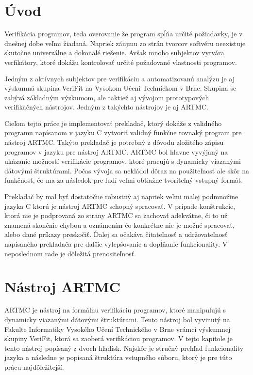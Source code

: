 
\chapter{Úvod}
Verifikácia programov, teda overovanie že program spĺňa určité požiadavky, je v dnešnej dobe veľmi žiadaná. Napriek záujmu zo strán tvorcov softvéru neexistuje skutočne univerzálne a dokonalé riešenie. Avšak mnoho subjektov vytvára verfikátory, ktoré dokážu kontrolovať určité požadované vlastnosti programov.

Jedným z aktívnych subjektov pre verifikáciu a automatizovanú analýzu je aj výskumná skupina VeriFit na Vysokom Učení Technickom v Brne. Skupina se zabývá základným výzkumom, ale taktiež aj vývojom prototypových verifikačných nástrojov. Jedným z takýchto nástrojov je aj ARTMC.

Cieľom tejto práce je implementovať prekladač, ktorý dokáže z validného programu napísanom v jazyku C vytvoriť validný funkčne rovnaký program pre nástroj ARTMC. Takýto prekladač je potrebný z dôvodu zložitého zápisu programov v jazyku pre nástroj ARTMC. ARTMC bol hlavne vyvýjaný na ukázanie možností verifikácie programov, ktoré pracujú s dynamicky viazanými dátovými štruktúrami. Počas vývoja sa nekládol dôraz na použiteľnosť ale skôr na funkčnosť, čo ma za následok pre ľudí veľmi obtiažne tvoriteľný vstupný formát.

Prekladač by mal byť dostatočne robustný aj napriek veľmi malej podmnožine jazyka C ktorú je nástroj ARTMC schopný spracovať. V prípade konštrukcie, ktorá nie je podprovaná zo strany ARTMC sa zachovať adekvátne, či to už znamená skončnie chybou a oznámením čo konkrétne nie je možné spracovať, alebo dané príkazy preskočiť. Ďalej sa očakáva čitateľnosť a udržovateľnosť napísaného prekladača pre dalšie vylepšovanie a dopĺňanie funkcionality. V neposlednom rade je dôležitá prenositeľnosť.


\chapter{Nástroj ARTMC}
ARTMC je nástroj na formálnu verifikáciu programov, ktoré manipulujú s
dynamicky viazanými dátovými štruktúrami. Tento nástroj bol vyvinutý na Fakulte
Informatiky Vysokého Učení Technického v Brne vrámci výskumnej skupiny VeriFit,
ktorá sa zaoberá verifikáciou programov. V tejto kapitole je tento nástroj
popísaný z dvoch hľadísk. Najskôr je stručný prehľad funkcionality jazyka a
následne je popísaná štruktúra vstupného súboru, ktorý je pre túto prácu
najdôležitejší.

